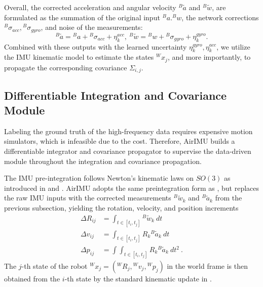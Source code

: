 Overall, the corrected acceleration and angular velocity ${}^B{\tilde a}$ and ${}^B{\tilde w}$, are formulated as the summation of the original input ${}^Ba. {}^Bw$, the network corrections ${}^B{\sigma_{acc}}, {}^B{\sigma_{gyro}}$, and noise of the measurements:
\begin{equation}
    {}^B{\tilde a} = {}^Ba + {}^B{\sigma_{acc}} + \eta^{acc}_k,\  {}^B{\tilde w} = {}^Bw + {}^B{\sigma_{gyro}}  + \eta^{gyro}_k.
\end{equation}
Combined with these outputs with the learned uncertainty $\eta^{gyro}_k, \eta^{acc}_k$, we utilize the IMU kinematic model to estimate the states ${}^Wx_j$, and more importantly, to propagate the corresponding covariance $\Sigma_{i,j}$.

\subsection{Differentiable Integration and Covariance Module}
\label{Model: Integrator}
Labeling the ground truth of the high-frequency data requires expensive motion simulators, which is infeasible due to the cost.
Therefore, AirIMU builds a differentiable integrator and covariance propagator to supervise the data-driven module throughout the integration and covariance propagation. 

The IMU pre-integration follows Newton's kinematic laws on $SO(3)$ as introduced in  and \cite{forster2015imu}.
AirIMU adopts the same preintegration form as , but replaces the raw IMU inputs with the corrected measurements ${}^B\tilde{w}_k$ and ${}^B\tilde{a}_k$ from the previous subsection, yielding the rotation, velocity, and position increments
\begin{equation}
    \begin{split}
    \label{formula: 2.integrate}
        {\Delta}R_{ij} &= \int_{t \in [t_i, t_j]} {}^B \tilde w_k \ dt \\
        {\Delta}v_{ij} &= \int_{t \in [t_i, t_j]} R_{k} {}^B \tilde a_k \ dt \\
        {\Delta}p_{ij} &= \int\int_{t \in [t_i, t_j]} R_{k} {}^B \tilde a_k\ dt^2\ .
    \end{split}
\end{equation}
The $j$-th state of the robot ${}^Wx_j=({}^WR_j,{}^Wv_j,{}^Wp_j)$ in the world frame is then obtained from the $i$-th state by the standard kinematic update in .

